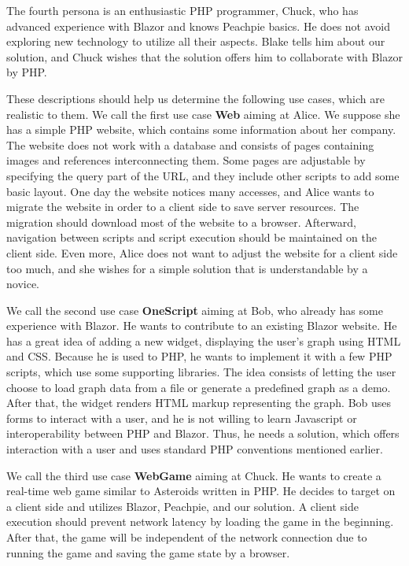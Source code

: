 The fourth persona is an enthusiastic PHP programmer, Chuck, who has advanced experience with Blazor and knows Peachpie basics.
He does not avoid exploring new technology to utilize all their aspects.
Blake tells him about our solution, and Chuck wishes that the solution offers him to collaborate with Blazor by PHP.
\par
These descriptions should help us determine the following use cases, which are realistic to them.
We call the first use case \textbf{Web} aiming at Alice.
We suppose she has a simple PHP website, which contains some information about her company.
The website does not work with a database and consists of pages containing images and references interconnecting them.
Some pages are adjustable by specifying the query part of the URL, and they include other scripts to add some basic layout.
One day the website notices many accesses, and Alice wants to migrate the website in order to a client side to save server resources.
The migration should download most of the website to a browser.
Afterward, navigation between scripts and script execution should be maintained on the client side.
Even more, Alice does not want to adjust the website for a client side too much, and she wishes for a simple solution that is understandable by a novice.
\par
We call the second use case \textbf{OneScript} aiming at Bob, who already has some experience with Blazor.
He wants to contribute to an existing Blazor website.
He has a great idea of adding a new widget, displaying the user's graph using HTML and CSS.
Because he is used to PHP, he wants to implement it with a few PHP scripts, which use some supporting libraries.
The idea consists of letting the user choose to load graph data from a file or generate a predefined graph as a demo.
After that, the widget renders HTML markup representing the graph.
Bob uses forms to interact with a user, and he is not willing to learn Javascript or interoperability between PHP and Blazor.
Thus, he needs a solution, which offers interaction with a user and uses standard PHP conventions mentioned earlier.
\par
We call the third use case \textbf{WebGame} aiming at Chuck.
He wants to create a real-time web game similar to Asteroids written in PHP.
He decides to target on a client side and utilizes Blazor, Peachpie, and our solution.
A client side execution should prevent network latency by loading the game in the beginning.
After that, the game will be independent of the network connection due to running the game and saving the game state by a browser.
